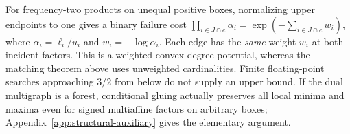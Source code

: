 For frequency-two products on unequal positive boxes, normalizing upper
endpoints to one gives a binary failure cost
$\prod_{i\in J\cap e}\alpha_i=\exp(-\sum_{i\in J\cap e}w_i)$,
where $\alpha_i=\ell_i/u_i$ and $w_i=-\log\alpha_i$. Each edge has
the \emph{same} weight $w_i$ at both incident factors. This is a weighted
convex degree potential, whereas the matching theorem above uses
unweighted cardinalities. Finite floating-point searches approaching
$3/2$ from below do not supply an upper bound. If the dual multigraph
is a forest, conditional gluing actually preserves all local minima
and maxima even for signed multiaffine factors on arbitrary boxes;
Appendix~\ref{app:structural-auxiliary} gives the elementary argument.
